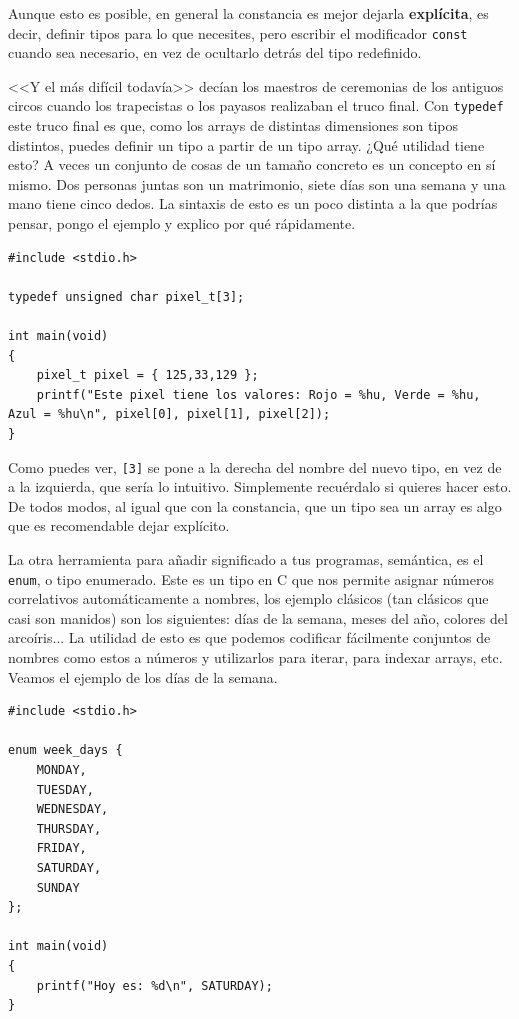 \documentclass[a4paper]{article}
\begin{document}
Aunque esto es posible, en general la constancia es mejor dejarla
\textbf{explícita}, es decir, definir tipos para lo que necesites, pero
escribir el modificador \verb!const! cuando sea necesario, en vez de ocultarlo
detrás del tipo redefinido.

<<Y el más difícil todavía>> decían los maestros de ceremonias de los antiguos
circos cuando los trapecistas o los payasos realizaban el truco final. Con
\verb!typedef! este truco final es que, como los arrays de distintas dimensiones
son tipos distintos, puedes definir un tipo a partir de un tipo array. ¿Qué
utilidad tiene esto? A veces un conjunto de cosas de un tamaño concreto es un
concepto en sí mismo. Dos personas juntas son un matrimonio, siete días son una
semana y una mano tiene cinco dedos. La sintaxis de esto es un poco distinta a
la que podrías pensar, pongo el ejemplo y explico por qué rápidamente.


\noindent
\begin{minipage}[H]{\linewidth}
\mbox{}
\begin{lstlisting}[style=C,
caption={Definición de un tipo personalizado a partir de un array},
label={lst:typedefArrayType}]
#include <stdio.h>

typedef unsigned char pixel_t[3];

int main(void)
{
    pixel_t pixel = { 125,33,129 };
    printf("Este pixel tiene los valores: Rojo = %hu, Verde = %hu, Azul = %hu\n", pixel[0], pixel[1], pixel[2]);
}
\end{lstlisting}
\end{minipage}

Como puedes ver, \verb![3]! se pone a la derecha del nombre del nuevo tipo, en
vez de a la izquierda, que sería lo intuitivo. Simplemente recuérdalo si quieres
hacer esto. De todos modos, al igual que con la constancia, que un tipo sea
un array es algo que es recomendable dejar explícito.

La otra herramienta para añadir significado a tus programas, semántica, es
el \verb!enum!, o tipo enumerado. Este es un tipo en C que nos permite asignar
números correlativos automáticamente a nombres, los ejemplo clásicos (tan
clásicos que casi son manidos) son los siguientes: días de la semana,
meses del año, colores del arcoíris... La utilidad de esto es que podemos
codificar fácilmente conjuntos de nombres como estos a números y utilizarlos
para iterar, para indexar arrays, etc. Veamos el ejemplo de los días de la
semana.


\noindent
\begin{minipage}[H]{\linewidth}
\mbox{}
\begin{lstlisting}[style=C,
caption={Ejemplo básico de tipo enumerado},
label={lst:BasicEnum}]
#include <stdio.h>

enum week_days {
    MONDAY,
    TUESDAY,
    WEDNESDAY,
    THURSDAY,
    FRIDAY,
    SATURDAY,
    SUNDAY
};

int main(void)
{
    printf("Hoy es: %d\n", SATURDAY);
}
\end{lstlisting}
\end{minipage}
\end{document}
